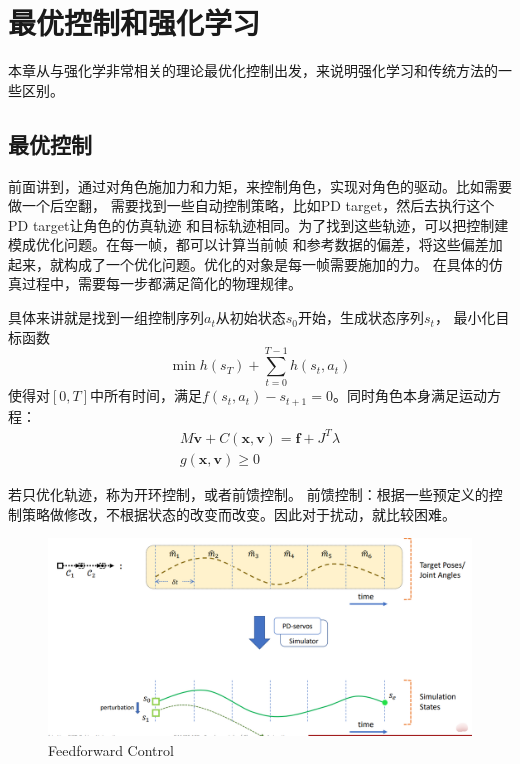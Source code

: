 \documentclass[lang=cn,newtx,10pt,scheme=chinese]{elegantbook}
\begin{document}
\chapter{最优控制和强化学习}
本章从与强化学非常相关的理论最优化控制出发，来说明强化学习和传统方法的一些区别。
\section{最优控制}
前面讲到，通过对角色施加力和力矩，来控制角色，实现对角色的驱动。比如需要做一个后空翻，
需要找到一些自动控制策略，比如PD target，然后去执行这个PD target让角色的仿真轨迹
和目标轨迹相同。为了找到这些轨迹，可以把控制建模成优化问题。在每一帧，都可以计算当前帧
和参考数据的偏差，将这些偏差加起来，就构成了一个优化问题。优化的对象是每一帧需要施加的力。
在具体的仿真过程中，需要每一步都满足简化的物理规律。

具体来讲就是找到一组控制序列${a_t}$从初始状态$s_0$开始，生成状态序列${s_t}$，
最小化目标函数
\begin{equation}
  \label{eq:trajectory}
  \min h\left(s_T\right)+\sum_{t=0}^{T-1} h\left(s_t, a_t\right)
\end{equation}
使得对$[0, T]$中所有时间，满足$f(s_t, a_t) - s_{t+1} = 0$。同时角色本身满足运动方程：
\begin{equation}
  \label{eq:trajectorycontrol}
  \begin{gathered}
  M \dot{\boldsymbol{v}}+C(\boldsymbol{x}, \boldsymbol{v})=\boldsymbol{f}+J^T \lambda \\
  g(\boldsymbol{x}, \boldsymbol{v}) \geq 0
  \end{gathered}
\end{equation}

若只优化轨迹，称为开环控制，或者前馈控制。
前馈控制：根据一些预定义的控制策略做修改，不根据状态的改变而改变。因此对于扰动，就比较困难。

\begin{figure}[htbp]
  \centering
  \includegraphics[totalheight=1.6in]{"./image/Feedforward-Control.png"}
  \caption{Feedforward Control} \label{fig:Feedforward-Controll}
\end{figure}
\end{document}
